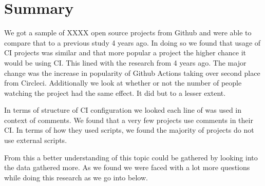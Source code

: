 \documentclass[twoside,12pt,titlepage,a4paper]{article}
\begin{document}






\pagebreak



\section{Summary}

We got a sample of XXXX open source projects from Github and were able to compare that to a previous study 4 years ago. In doing so we found that usage of CI projects was similar and that more popular a project the higher chance it would be using CI. This lined with the research from 4 years ago. The major change was the increase in popularity of Github Actions taking over second place from Circleci. Additionally we look at whether or not the number of people watching the project had the same effect. It did but to a lesser extent.

In terms of structure of CI configuration we looked each line of was used in context of comments. We found that a very few projects use comments in their CI. In terms of how they used scripts, we found the majority of projects do not use external scripts. 

From this a better understanding of this topic could be gathered by looking into the data gathered more. As we found we were faced with a lot more questions while doing this research as we go into below.
\end{document}
